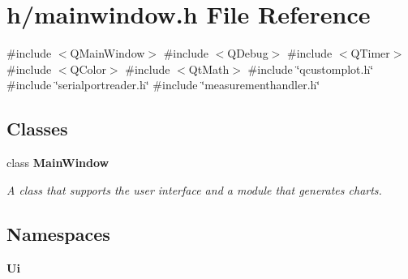 \section{h/mainwindow.h File Reference}
\label{mainwindow_8h}
{\ttfamily \#include $<$Q\+Main\+Window$>$}\newline
{\ttfamily \#include $<$Q\+Debug$>$}\newline
{\ttfamily \#include $<$Q\+Timer$>$}\newline
{\ttfamily \#include $<$Q\+Color$>$}\newline
{\ttfamily \#include $<$Qt\+Math$>$}\newline
{\ttfamily \#include \char`\"{}qcustomplot.\+h\char`\"{}}\newline
{\ttfamily \#include \char`\"{}serialportreader.\+h\char`\"{}}\newline
{\ttfamily \#include \char`\"{}measurementhandler.\+h\char`\"{}}\newline
\subsection*{Classes}
\begin{DoxyCompactItemize}
\item 
class \textbf{ Main\+Window}
\begin{DoxyCompactList}\small\item\em A class that supports the user interface and a module that generates charts. \end{DoxyCompactList}\end{DoxyCompactItemize}
\subsection*{Namespaces}
\begin{DoxyCompactItemize}
\item 
 \textbf{ Ui}
\end{DoxyCompactItemize}
